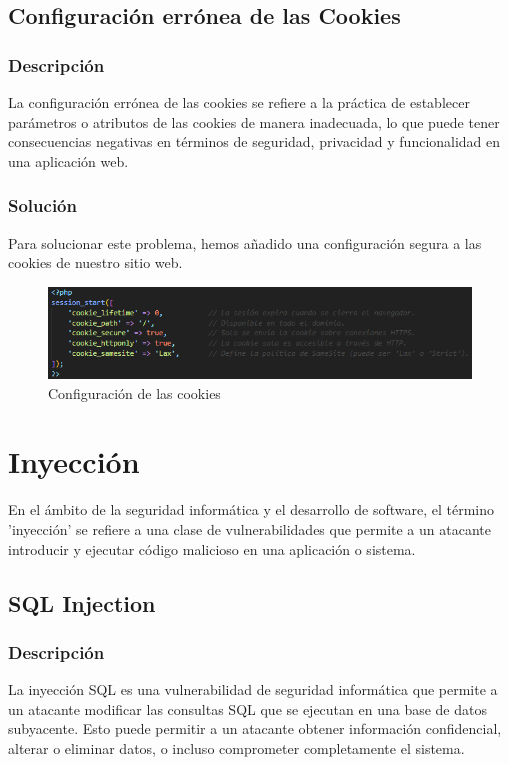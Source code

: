 \documentclass{report}
\begin{document}
            \subsection{Configuración errónea de las Cookies}
                \subsubsection{Descripción}
                    La configuración errónea de las cookies se refiere a la práctica de establecer parámetros o atributos de las cookies de manera inadecuada, lo que puede tener consecuencias negativas en términos de seguridad, privacidad y funcionalidad en una aplicación web.                
                \subsubsection{Solución}
                    Para solucionar este problema, hemos añadido una configuración segura a las cookies de nuestro sitio web.
                    \begin{figure}[H]
                        \centering
                        \includegraphics[width=\textwidth]{./img/vulnerabilidades/3.2/3.1.png}
                        \caption{Configuración de las cookies}
                    \end{figure}
            \clearpage
        \section{Inyección}
            En el ámbito de la seguridad informática y el desarrollo de software, el término 'inyección' se refiere a una clase de vulnerabilidades que permite a un atacante introducir y ejecutar código malicioso en una aplicación o sistema. 
            \subsection{SQL Injection}
                \subsubsection{Descripción}
                    La inyección SQL es una vulnerabilidad de seguridad informática que permite a un atacante modificar las consultas SQL que se ejecutan en una base de datos subyacente. Esto puede permitir a un atacante obtener información confidencial, alterar o eliminar datos, o incluso comprometer completamente el sistema.
\end{document}
